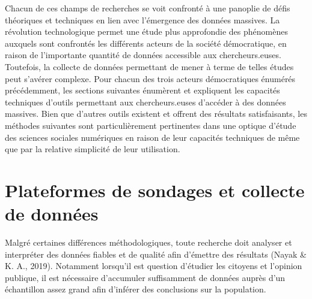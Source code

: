 \documentclass[
  letterpaper,
]{scrbook}
\begin{document}
Chacun de ces champs de recherches se voit confronté à une panoplie de
défis théoriques et techniques en lien avec l'émergence des données
massives. La révolution technologique permet une étude plus approfondie
des phénomènes auxquels sont confrontés les différents acteurs de la
société démocratique, en raison de l'importante quantité de données
accessible aux chercheurs.euses. Toutefois, la collecte de données
permettant de mener à terme de telles études peut s'avérer complexe.
Pour chacun des trois acteurs démocratiques énumérés précédemment, les
sections suivantes énumèrent et expliquent les capacités techniques
d'outils permettant aux chercheurs.euses d'accéder à des données
massives. Bien que d'autres outils existent et offrent des résultats
satisfaisants, les méthodes suivantes sont particulièrement pertinentes
dans une optique d'étude des sciences sociales numériques en raison de
leur capacités techniques de même que par la relative simplicité de leur
utilisation.

\hypertarget{section-1}{%
\section{}\label{section-1}}

\hypertarget{plateformes-de-sondages-et-collecte-de-donnuxe9es}{%
\section{Plateformes de sondages et collecte de
données}\label{plateformes-de-sondages-et-collecte-de-donnuxe9es}}

Malgré certaines différences méthodologiques, toute recherche doit
analyser et interpréter des données fiables et de qualité afin d'émettre
des résultats (Nayak \& K. A., 2019). Notamment lorsqu'il est question
d'étudier les citoyens et l'opinion publique, il est nécessaire
d'accumuler suffisamment de données auprès d'un échantillon assez grand
afin d'inférer des conclusions sur la population.
\end{document}
